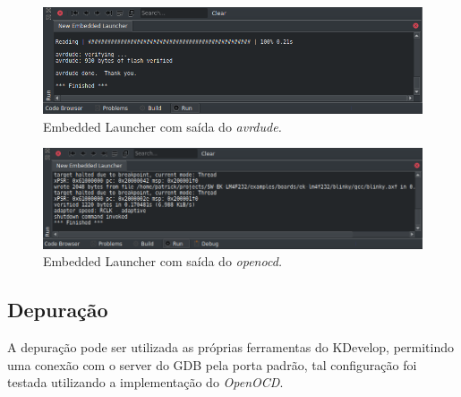 \begin{figure}[!htb]
  \centering
  \caption[Embedded Launcher com \textit{avrdude}]{Embedded Launcher com saída do \textit{avrdude.}}
  \label{fig:runavrdude}
  \includegraphics[width=1\textwidth]{figuras/runavrdude.png}
\end{figure}

\begin{figure}[!htb]
  \centering
  \caption[Embedded Launcher com \textit{openocd}]{Embedded Launcher com saída do \textit{openocd.}}
  \label{fig:runopenocd}
  \includegraphics[width=1\textwidth]{figuras/runopenocd.png}
\end{figure}

\subsection{Depuração}

A depuração pode ser utilizada as próprias ferramentas do KDevelop, permitindo uma conexão com o server do GDB pela porta padrão, tal configuração foi testada utilizando a implementação do \textit{OpenOCD}.

